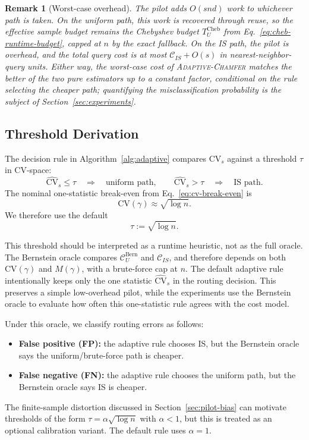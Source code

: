 \documentclass[conference]{IEEEtran}
\newtheorem{remark}{Remark}
\begin{document}
\begin{remark}[Worst-case overhead]
\label{rem:adaptive-overhead}
The pilot adds $O(snd)$ work to whichever path is taken. On the
uniform path, this work is recovered through reuse, so the effective
sample budget remains the Chebyshev budget
$T_U^{\mathrm{Cheb}}$ from Eq.~\ref{eq:cheb-runtime-budget}, capped at
$n$ by the exact fallback. On the IS path, the pilot is overhead, and
the total query cost is at most
$\mathcal{C}_{IS} + O(s)$ in nearest-neighbor-query units. Either way,
the worst-case cost of \textsc{Adaptive-Chamfer} matches the better of
the two pure estimators up to a constant factor, conditional on the
rule selecting the cheaper path; quantifying the misclassification
probability is the subject of Section~\ref{sec:experiments}.
\end{remark}

\subsection{Threshold Derivation}
\label{sec:adaptive-threshold}

The decision rule in Algorithm~\ref{alg:adaptive} compares
$\widehat{\mathrm{CV}}_s$ against a threshold $\tau$ in CV-space:
\[
    \widehat{\mathrm{CV}}_s \leq \tau
    \quad\Longrightarrow\quad
    \text{uniform path},
    \qquad
    \widehat{\mathrm{CV}}_s > \tau
    \quad\Longrightarrow\quad
    \text{IS path}.
\]
The nominal one-statistic break-even from Eq.~\ref{eq:cv-break-even}
is
\[
    \mathrm{CV}(\gamma)\approx \sqrt{\log n}.
\]
We therefore use the default
\begin{equation}
    \tau := \sqrt{\log n}.
\label{eq:tau-default}
\end{equation}

This threshold should be interpreted as a runtime heuristic, not as
the full oracle. The Bernstein oracle compares
$\mathcal{C}_U^{\mathrm{Bern}}$ and $\mathcal{C}_{IS}$, and therefore
depends on both $\mathrm{CV}(\gamma)$ and $M(\gamma)$, with a
brute-force cap at $n$. The default adaptive rule intentionally keeps
only the one statistic $\widehat{\mathrm{CV}}_s$ in the routing
decision. This preserves a simple low-overhead pilot, while the
experiments use the Bernstein oracle to evaluate how often this
one-statistic rule agrees with the cost model.

Under this oracle, we classify routing errors as follows:
\begin{itemize}
    \item \textbf{False positive (FP):} the adaptive rule chooses IS,
    but the Bernstein oracle says the uniform/brute-force path is
    cheaper.
    \item \textbf{False negative (FN):} the adaptive rule chooses the
    uniform path, but the Bernstein oracle says IS is cheaper.
\end{itemize}
The finite-sample distortion discussed in Section~\ref{sec:pilot-bias}
can motivate thresholds of the form
$\tau=\alpha\sqrt{\log n}$ with $\alpha<1$, but this is treated as an
optional calibration variant. The default rule uses $\alpha=1$.
\end{document}
